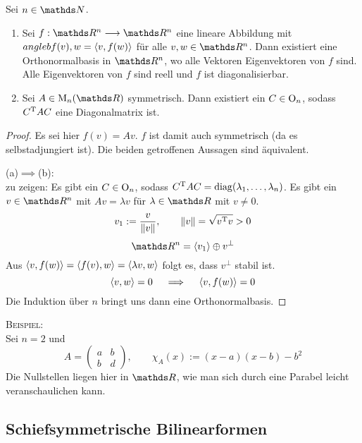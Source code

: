 			\begin{theorem}
				Sei $n\in\SN$.
				\begin{enumerate}[label = \normalfont (\alph*)]
					\item Sei $f:\SR^n\longrightarrow\SR^n$ eine lineare Abbildung mit $angleb{f(v),w} = \left\langle v,f(w) \right\rangle$ für alle $v,w\in\SR^n$.
						Dann existiert eine Orthonormalbasis in $\SR^n$, wo alle Vektoren Eigenvektoren von $f$ sind.
						Alle Eigenvektoren von $f$ sind reell und $f$ ist diagonalisierbar.
					\item Sei $A\in\m{M}_n(\SR)$ symmetrisch.
						Dann existiert ein $C\in\mathrm{O}_n$, sodass $C^\mathrm{T} AC$ eine Diagonalmatrix ist.
				\end{enumerate}

			\end{theorem}
			\begin{proof}
				Es sei hier $f(v)=Av$.
				$f$ ist damit auch symmetrisch (da es selbstadjungiert ist).
				Die beiden getroffenen Aussagen sind äquivalent.

				(a)$\implies$(b):\\
				zu zeigen: Es gibt ein $C\in\mathrm{O}_n$, sodass $C^\mathrm{T} A C = \operatorname{diag} (\lambda_1,\ldots,\lambda_n)$.
				Es gibt ein $v\in\SR^n$ mit $Av=\lambda v$ für $\lambda\in\SR$ mit $v\neq 0$.
				\[ v_1 := \frac{v}{\left\| v \right\|},\qquad \left\| v \right\|=\sqrt{v^\mathrm{T} v}> 0 \]
				\[ \SR^n = \angleb{v_1}\oplus v^\perp \]
				Aus $\left\langle v,f(w) \right\rangle=\left\langle f(v),w \right\rangle=\left\langle \lambda v, w \right\rangle$ folgt es, dass $v^\perp$ stabil ist.
				\[ \left\langle v,w \right\rangle=0 \quad \implies \quad \left\langle v,f(w) \right\rangle=0 \]
				Die Induktion über $n$ bringt uns dann eine Orthonormalbasis.
			\end{proof}

			\textsc{Beispiel:}\\
			Sei $n=2$ und
			\[ A = \begin{pmatrix}
				a & b \\ b & d
			\end{pmatrix},\qquad \chi_A(x) := (x-a)(x-b) - b^2 \]
			Die Nullstellen liegen hier in $\SR$, wie man sich durch eine Parabel leicht veranschaulichen kann.


		\subsection{Schiefsymmetrische Bilinearformen} %
		\label{sub:schiefsymmetrische_bilinearformen}
		
